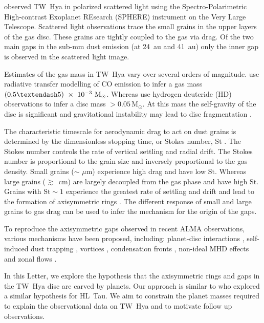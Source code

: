 \documentclass[usenatbib,a4paper,times]{mnras}
\newcommand{\st}{\mathrm{St}}
\renewcommand{\sun}{\mathrm{M}_{\odot}}
\begin{document}
\citet{van-boekel:2017} observed TW~Hya in polarized scattered light using the
Spectro-Polarimetric High-contrast Exoplanet REsearch (SPHERE) instrument on
the Very Large Telescope. Scattered light observations trace the small grains in
the upper layers of the gas disc. These grains are tightly coupled to the gas
via drag. Of the two main gaps in the sub-mm dust emission (at 24~au and 41~au)
only the inner gap is observed in the scattered light image.

Estimates of the gas mass in TW~Hya vary over several orders of magnitude.
\citet{thi:2010} use radiative transfer modelling of CO emission to infer a gas
mass $(0.5\textendash 5)~\times~10^{-3}~\sun{}$. Whereas \citet{bergin:2013} use
hydrogen deuteride (HD) observations to infer a disc mass $>0.05\,\sun{}$. At
this mass the self-gravity of the disc is significant and gravitational
instability may lead to disc fragmentation \citep{kratter:2016}.

The characteristic timescale for aerodynamic drag to act on dust grains is
determined by the dimensionless stopping time, or Stokes number, $\st{}$
\citep{weidenschilling:1977, takeuchi:2002}. The Stokes number controls the rate
of vertical settling and radial drift. The Stokes number is proportional to the
grain size and inversely proportional to the gas density. Small grains ($\sim$
$\mu$m) experience high drag and have low $\st{}$. Whereas large grains
($\gtrsim$~cm) are largely decoupled from the gas phase and have high $\st{}$.
Grains with $\st{}\sim1$ experience the greatest rate of settling and drift and
lead to the formation of axisymmetric rings \citep{ayliffe:2012, dipierro:2015}.
The different response of small and large grains to gas drag can be used to
infer the mechanism for the origin of the gaps.

To reproduce the axisymmetric gaps observed in recent ALMA observations, various
mechanisms have been proposed, including: planet-disc interactions
\citep{dipierro:2015}, self-induced dust trapping \citep{gonzalez:2017},
vortices \citep{zhu:2014}, condensation fronts \citep{zhang:2015}, non-ideal MHD
effects \citep{bethune:2016} and zonal flows \citep{johansen:2009,flock:2015}.

In this Letter, we explore the hypothesis that the axisymmetric rings and gaps
in the TW~Hya disc are carved by planets. Our approach is similar to
\citet{dipierro:2015} who explored a similar hypothesis for HL~Tau. We aim to
constrain the planet masses required to explain the observational data on TW~Hya
and to motivate follow up observations.
\end{document}
